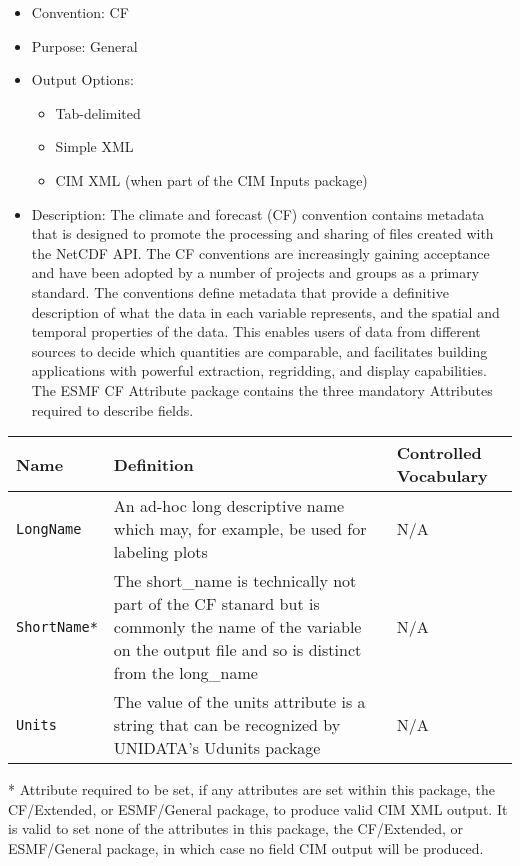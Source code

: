\begin{itemize}
    \item Convention: CF
    \item Purpose: General
    \item Output Options:
    \begin{itemize}
        \item Tab-delimited
        \item Simple XML
        \item CIM XML (when part of the CIM Inputs package)
    \end{itemize} 
    \item  Description: The climate and forecast (CF) convention contains metadata that is designed to promote the processing and sharing of files created with the NetCDF API. The CF conventions are increasingly gaining acceptance and have been adopted by a number of projects and groups as a primary standard. The conventions define metadata that provide a definitive description of what the data in each variable represents, and the spatial and temporal properties of the data. This enables users of data from different sources to decide which quantities are comparable, and facilitates building applications with powerful extraction, regridding, and display capabilities. The ESMF CF Attribute package contains the three mandatory Attributes required to describe fields. 
\end{itemize}

\begin{tabular}{|p{5cm}|p{5cm}|p{4cm}|}
    \hline\hline
    {\bf Name } & {\bf Definition} & {\bf Controlled Vocabulary} \\
    \hline\hline
    {\tt LongName} & An ad-hoc long descriptive name which may, for example, be used for labeling plots & N/A\\
    {\tt ShortName*}  & The short\_name is technically not part of the CF stanard but is commonly the name of the variable on the output file and so is
 distinct from the long\_name & N/A \\
    {\tt Units}  & The value of the units attribute is a string that can be recognized by UNIDATA's Udunits package & N/A\\
    \hline\hline
\end{tabular}
\linebreak
* Attribute required to be set, if any attributes are set within this package, the CF/Extended, or ESMF/General package, to produce valid CIM XML output. It is valid to set none of the attributes in this package, the CF/Extended, or ESMF/General package, in which case no field CIM output will be produced. \\

